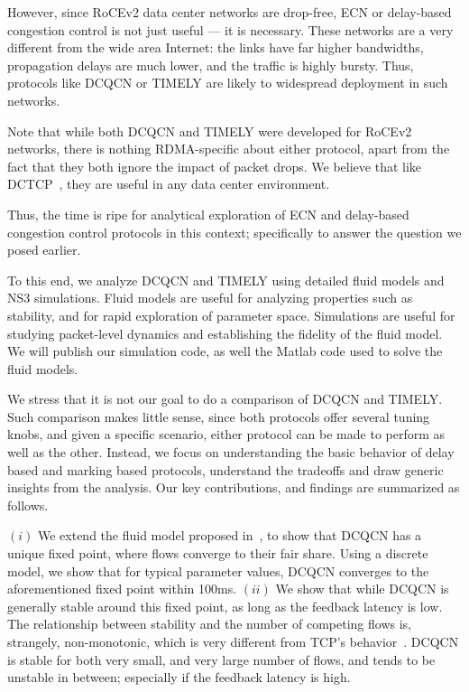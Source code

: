However, since RoCEv2 data center networks are drop-free, ECN or
delay-based congestion control is not just useful --- it is necessary. These
networks are a very different from the wide area Internet: the links have far
higher bandwidths, propagation delays are much lower, and the traffic is highly
bursty. Thus, protocols like DCQCN or TIMELY are likely to widespread deployment
in such networks.

Note that while both DCQCN and TIMELY were developed for RoCEv2 networks, there
is nothing RDMA-specific about either protocol, apart from the fact that they
both ignore the impact of packet drops. We believe that like DCTCP~\cite{dctcp},
they are useful in any data center environment.

Thus, the time is ripe for analytical exploration of ECN and delay-based
congestion control protocols in this context; specifically to answer the
question we posed earlier.


To this end, we analyze DCQCN and TIMELY using detailed fluid models and NS3
simulations.  Fluid models are useful for analyzing properties such as
stability, and for rapid exploration of parameter space.  Simulations are useful
for studying packet-level dynamics and establishing the fidelity of the fluid
model.  We will publish our simulation code, as well the Matlab code used to
solve the fluid models.


We stress that it is not our goal to do a comparison of DCQCN and
TIMELY.  Such comparison makes little sense, since both protocols offer several
tuning knobs, and given a specific scenario, either protocol can be made to
perform as well as the other. Instead, we focus on understanding the basic
behavior of delay based and marking based protocols, understand the
tradeoffs and draw generic insights from the analysis.
Our key contributions, and findings are summarized as follows.

 $(i)$ We extend the fluid model proposed in~\cite{dcqcn}, to show
that DCQCN has a unique fixed point, where flows converge to their fair share.
Using a discrete model, we show that for typical parameter values, DCQCN
converges to the aforementioned fixed point within 100ms.  $(ii)$ We show that
while DCQCN is generally stable around this fixed point, as long as the feedback
latency is low. The relationship between stability and the number of competing
flows is, strangely, non-monotonic, which is very different from TCP's
behavior~\cite{misra:TAC2002}. DCQCN is stable for both very small, and very
large number of flows, and tends to be unstable in between; especially if the
feedback latency is high.

